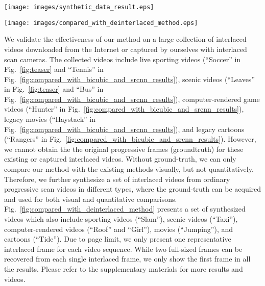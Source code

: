 \begin{figure*}[!tp]
	\centering
	\texttt{[image: images/synthetic\_data\_result.eps]}\\
	\caption{We compare our method with bicubic interpolation and SRCNN. Row $1$ and row $3$: two input interlaced frames and deinterlaced results with different methods. Row $2$ and row $4$: patches extracted from row $1$ and row $3$ respectively.}\label{fig:compared_with_bicubic_and_srcnn_results}
\end{figure*}

\begin{figure*}[!tp]
	\centering
	\texttt{[image: images/compared\_with\_deinterlaced\_method.eps]}\\
	\caption{We compare our method with state-of-the-art deinterlacing methods. Row $1$ and row $3$: two input interlaced frames and deinterlaced results with different methods. Row $2$ and row $4$: patches extracted from row $1$ and row $3$ respectively.}\label{fig:compared_with_deinterlaced_method}
\end{figure*}

We validate the effectiveness of our method on a large collection of interlaced videos downloaded from the Internet or captured by ourselves with interlaced scan cameras. The collected videos include live sporting videos (``Soccer'' in Fig.~\ref{fig:teaser} and ``Tennis'' in Fig.~\ref{fig:compared_with_bicubic_and_srcnn_results}), scenic videos (``Leaves'' in Fig.~\ref{fig:teaser} and ``Bus'' in Fig.~\ref{fig:compared_with_bicubic_and_srcnn_results}), computer-rendered game videos (``Hunter'' in Fig.~\ref{fig:compared_with_bicubic_and_srcnn_results}), legacy movies (``Haystack'' in Fig.~\ref{fig:compared_with_bicubic_and_srcnn_results}), and legacy cartoons (``Rangers'' in Fig.~\ref{fig:compared_with_bicubic_and_srcnn_results}). However, we cannot obtain the the original progressive frames (groundtruth) for these existing or captured interlaced videos. Without ground-truth, we can only compare our method with the existing methods visually, but not quantitatively. Therefore, we further synthesize a set of interlaced videos from ordinary progressive scan videos in different types, where the ground-truth can be acquired and used for both visual and quantitative comparisons. Fig.~\ref{fig:compared_with_deinterlaced_method} presents a set of synthesized videos which also include sporting videos (``Slam''), scenic videos (``Taxi''), computer-rendered videos (``Roof'' and ``Girl''), movies (``Jumping''), and cartoons (``Tide''). Due to page limit, we only present one representative interlaced frame for each video sequence. While two full-sized frames can be recovered from each single interlaced frame, we only show the first frame in all the results. Please refer to the supplementary materials for more results and videos.

